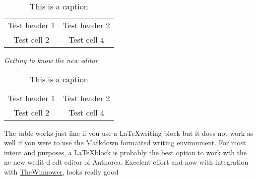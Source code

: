 \begin{table} 
    \begin{tabular}{ c c }
        Test header 1 & Test header 2 \\ 
        Test cell 2 & Test cell 4 \\ 
    \end{tabular} 
    \caption{This is a caption} 
\end{table}\textit{Getting to know the new editor}

\begin{table} 
    \begin{tabular}{ c c }
        Test header 1 & Test header 2 \\ 
        Test cell 2 & Test cell 4 \\ 
    \end{tabular} 
    \caption{This is a caption} 
\end{table}

The table works just fine if you use a \LaTeX writing block but it does not work as well if you were to use the Markdown formatted writing environment. For most intent and purposes, a \LaTeX block is probably the best option to work wth the ne new wedit d edt editor of Authorea. Excelent effort and now with integration with \href{http://www.thewinnower.com}{TheWinnower}, looks really good
